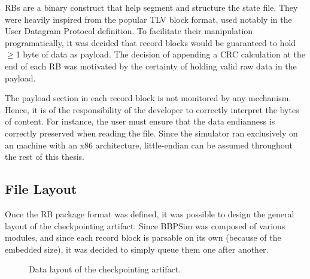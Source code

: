 {RBs are a binary construct that help segment and structure the state file. They were heavily inspired from the popular \gls{TLV} block format, used notably in the User Datagram Protocol definition\cite{report:udp}. To facilitate their manipulation programatically, it was decided that record blocks would be guaranteed to hold $\geq$1 byte of data as payload. The decision of appending a \gls{CRC} calculation at the end of each RB was motivated by the certainty of holding valid raw data in the payload.

The payload section in each record block is not monitored by any mechanism. Hence, it is of the responsibility of the developer to correctly interpret the bytes of content. For instance, the user must ensure that the data endianness is correctly preserved when reading the file. Since the simulator ran exclusively on an machine with an x86 architecture, little-endian can be assumed throughout the rest of this thesis.

\subsection*{File Layout}
Once the RB package format was defined, it was possible to design the general layout of the checkpointing artifact. Since \gls{BBPSim} was composed of various modules, and since each record block is parsable on its own (because of the embedded size), it was decided to simply queue them one after another. 

\begin{figure}[h]
	\vspace{6pt}
	\centering
	\small
	
	\caption{Data layout of the checkpointing artifact.}
	\label{fig:file-layout}
\end{figure}

}
